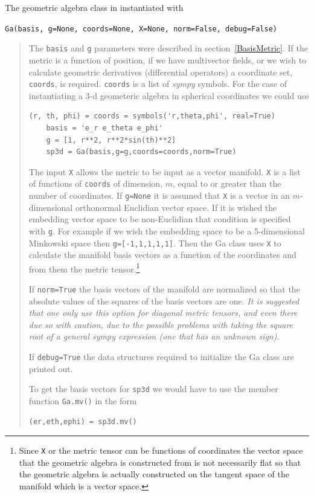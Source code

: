 \documentclass[12pt,twoside,openright]{memoir}
\newcommand{\T}[1]{\texttt{#1}}
\begin{document}
The geometric algebra class in instantiated with

\T{Ga(basis, g=None, coords=None, X=None, norm=False, debug=False)}
\begin{quote}
   The \T{basis} and \T{g} parameters were described in section~\ref{BasisMetric}.
   If the metric is a function of position, if we have multivector fields, or we 
   wish to calculate geometric derivatives (differential operators) a coordinate set, \T{coords}, is required. 
   \T{coords} is a list of \emph{sympy} symbols.  For the case of instantiating a 3-d geometeric
   algebra in spherical coordinates we could use
   \begin{lstlisting}[numbers=none]
   	(r, th, phi) = coords = symbols('r,theta,phi', real=True)
   	basis = 'e_r e_theta e_phi'
   	g = [1, r**2, r**2*sin(th)**2]
   	sp3d = Ga(basis,g=g,coords=coords,norm=True)
   \end{lstlisting}
   The input \T{X} allows the metric to be input as a vector manifold.
   \T{X} is a list of functions of \T{coords} of dimension, $m$, equal to or greater
   than the number of coordinates.  If \T{g=None} it is assumed that \T{X} is a 
   vector in an $m$-dimensional orthonormal Euclidian vector space. If it is wished
   the embedding vector space to be non-Euclidian that condition is specified with
   \T{g}.  For example if we wish the embedding space to be a 5-dimensional Minkowski
   space then \T{g=[-1,1,1,1,1]}.  Then the Ga class uses \T{X} to calculate the
   manifold basis vectors as a function of the coordinates and from them the metric
   tensor.\footnote{Since \T{X} or the metric tensor can be functions of coordinates
   the vector space that the geometric algebra is constructed from is not necessarily 
   flat so that the geometric algebra is actually constructed on the tangent space of
   the manifold which is a vector space.}

   If \T{norm=True} the basis vectors of the manifold are normalized so that the 
   absolute values of the squares of the basis vectors are one. \emph{It is suggested
   that one only use this option for diagonal metric tensors, and even there due so
   with caution, due to the possible 
   problems with taking the square root of a general \emph{sympy} expression (one that has an
   unknown sign).}
     
   If \T{debug=True} the data structures required to initialize the Ga class
   are printed out.
   
   To get the basis vectors for \T{sp3d} we would have to use the member function 
   \T{Ga.mv()} in the form
   \begin{lstlisting}[numbers=none]
	(er,eth,ephi) = sp3d.mv()
   \end{lstlisting}   
\end{quote}
\end{document}
